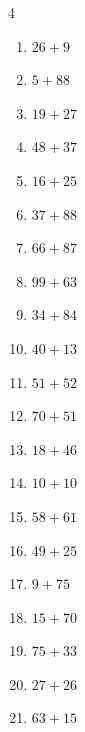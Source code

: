 \begin{multicols}{4}
\begin{enumerate}
  \item $26+9$
        \phantom{$=35$}

  \item $5+88$
        \phantom{$=93$}

  \item $19+27$
        \phantom{$=46$}

  \item $48+37$
        \phantom{$=85$}

  \item $16+25$
        \phantom{$=41$}

  \item $37+88$
        \phantom{$=125$}

\columnbreak %

  \item $66+87$
        \phantom{$=153$}

  \item $99+63$
        \phantom{$=162$}

  \item $34+84$
        \phantom{$=118$}

  \item $40+13$
        \phantom{$=53$}

  \item $51+52$
        \phantom{$=103$}

  \item $70+51$
        \phantom{$=121$}

  \item $18+46$
        \phantom{$=64$}

  \item $10+10$
        \phantom{$=20$}

  \item $58+61$
        \phantom{$=119$}

  \item $49+25$
        \phantom{$=74$}

  \item $9+75$
        \phantom{$=84$}

  \item $15+70$
        \phantom{$=85$}

  \item $75+33$
        \phantom{$=108$}

  \item $27+26$
        \phantom{$=53$}

  \item $63+15$
        \phantom{$=78$}


\end{enumerate}
\end{multicols}
